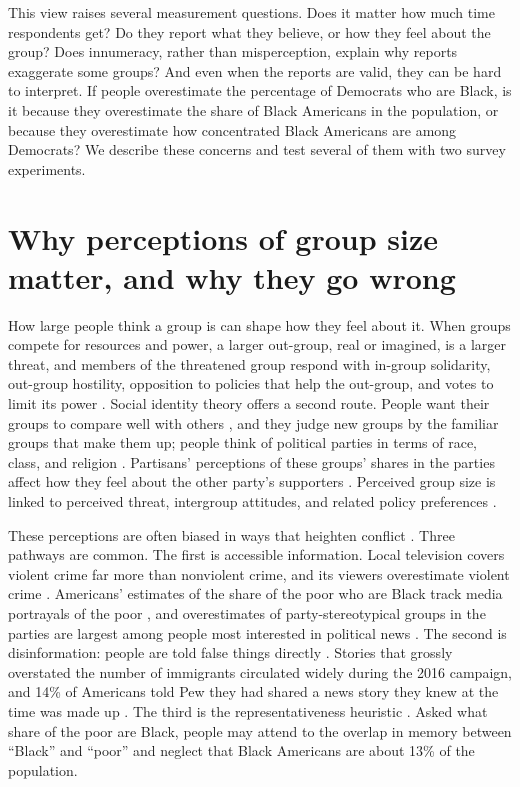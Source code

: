 \documentclass[11pt]{article}
\begin{document}
This view raises several measurement questions. Does it matter how much time respondents get? Do they report what they believe, or how they feel about the group? Does innumeracy, rather than misperception, explain why reports exaggerate some groups? And even when the reports are valid, they can be hard to interpret. If people overestimate the percentage of Democrats who are Black, is it because they overestimate the share of Black Americans in the population, or because they overestimate how concentrated Black Americans are among Democrats? We describe these concerns and test several of them with two survey experiments.

\section{Why perceptions of group size matter, and why they go wrong}

How large people think a group is can shape how they feel about it. When groups compete for resources and power, a larger out-group, real or imagined, is a larger threat, and members of the threatened group respond with in-group solidarity, out-group hostility, opposition to policies that help the out-group, and votes to limit its power \citep{campbell1965, nadeau1993, sides2007a, blalock1967, dancygier2010, key1949}. Social identity theory offers a second route. People want their groups to compare well with others \citep{tajfel2004, tajfel1970}, and they judge new groups by the familiar groups that make them up; people think of political parties in terms of race, class, and religion \citep{green2002}. Partisans' perceptions of these groups' shares in the parties affect how they feel about the other party's supporters \citep{ahler2018}. Perceived group size is linked to perceived threat, intergroup attitudes, and related policy preferences \citep{sides2007a, wong2007, wong2012}.

These perceptions are often biased in ways that heighten conflict \citep{ahler2018, nadeau1993, sides2007a}. Three pathways are common. The first is accessible information. Local television covers violent crime far more than nonviolent crime, and its viewers overestimate violent crime \citep{romer2003}. Americans' estimates of the share of the poor who are Black track media portrayals of the poor \citep{gilens1996}, and overestimates of party-stereotypical groups in the parties are largest among people most interested in political news \citep{ahler2018}. The second is disinformation: people are told false things directly \citep{jackson2007}. Stories that grossly overstated the number of immigrants circulated widely during the 2016 campaign, and 14\% of Americans told Pew they had shared a news story they knew at the time was made up \citep{barthel2016}. The third is the representativeness heuristic \citep{bordalo2016, tversky1974}. Asked what share of the poor are Black, people may attend to the overlap in memory between ``Black'' and ``poor'' and neglect that Black Americans are about 13\% of the population.
\end{document}
